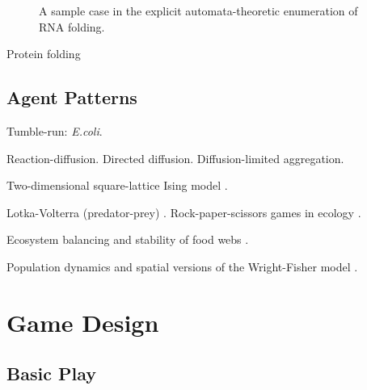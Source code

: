 \documentclass{acm_proc_article-sp}
\begin{document}
\begin{figure}
\caption{
\label{fig:rna}
A sample case in the explicit automata-theoretic enumeration of RNA folding.
}
\end{figure}

Protein folding \cite{PandeRokhsar1999}

\subsection{Agent Patterns}

Tumble-run: {\em E.coli}.
\cite{RosserEtAl2013}


Reaction-diffusion.
Directed diffusion.
Diffusion-limited aggregation.
\cite{DLA}

Two-dimensional square-lattice Ising model \cite{Onsager1944}.

Lotka-Volterra (predator-prey) \cite{LotkaVolterra,SpatialLotkaVolterra}.
Rock-paper-scissors games in ecology \cite{Tainaka2000}.

Ecosystem balancing and stability of food webs \cite{quince2005topological}.

Population dynamics and spatial versions of the Wright-Fisher model \cite{MathiesonMcVean2013}.

\section{Game Design}

\subsection{Basic Play}
\end{document}
